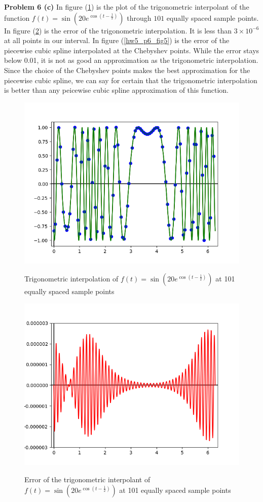 \documentclass[12pt]{article}
\newcommand{\problem}[1]{\hspace{-4 ex} \large \textbf{Problem #1} }
\begin{document}
\problem{6 (c)} In figure (\ref{hw5_p6_fig3}) is the plot of the trigonometric interpolant of the function $f(t) = \sin(20 e^{\cos(t-\frac{1}{2})})$ through $101$ equally spaced sample points. In figure (\ref{hw5_p6_fig4}) is the error of the trigonometric interpolation. It is less than $3 \times 10^{-6}$ at all points in our interval. In figure (\ref{hw5_p6_fig5}) is the error of the piecewise cubic spline interpolated at the Chebyshev points. While the error stays below 0.01, it is not as good an approximation as the trigonometric interpolation. Since the choice of the Chebyshev points makes the best approximation for the piecewise cubic spline, we can say for certain that the trigonometric interpolation is better than any peicewise cubic spline approximation of this function.

\begin{figure}[h]
	\caption{Trigonometric interpolation of $f(t) = \sin(20 e^{\cos(t-\tfrac{1}{2})})$ at 101 equally spaced sample points}
	\includegraphics[width=.8\textwidth]{hw5_p6_fig3}
	\label{hw5_p6_fig3}
	\centering
\end{figure}

\begin{figure}[h]
	\caption{Error of the trigonometric interpolant of $f(t) = \sin(20 e^{\cos(t-\tfrac{1}{2})})$ at 101 equally spaced sample points}
	\includegraphics[width=.8\textwidth]{hw5_p6_fig4}
	\label{hw5_p6_fig4}
	\centering
\end{figure}
\end{document}
